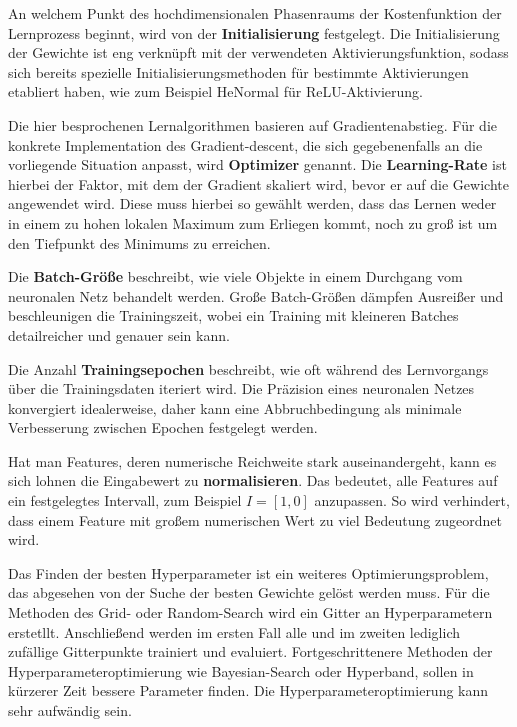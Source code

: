 An welchem Punkt des hochdimensionalen Phasenraums der Kostenfunktion der Lernprozess beginnt, wird von der \textbf{Initialisierung} festgelegt. Die Initialisierung der Gewichte ist eng verknüpft mit der verwendeten Aktivierungsfunktion, sodass sich bereits spezielle Initialisierungsmethoden für bestimmte Aktivierungen etabliert haben, wie zum Beispiel HeNormal für ReLU-Aktivierung. %

Die hier besprochenen Lernalgorithmen basieren auf Gradientenabstieg. Für die konkrete Implementation des Gradient-descent, die sich gegebenenfalls an die vorliegende Situation anpasst, wird \textbf{Optimizer} genannt. Die \textbf{Learning-Rate} ist hierbei der Faktor, mit dem der Gradient skaliert wird, bevor er auf die Gewichte angewendet wird. Diese muss hierbei so gewählt werden, dass das Lernen weder in einem zu hohen lokalen Maximum zum Erliegen kommt, noch zu groß ist um den Tiefpunkt des Minimums zu erreichen. 

Die \textbf{Batch-Größe} beschreibt, wie viele Objekte in einem Durchgang vom neuronalen Netz behandelt werden. Große Batch-Größen dämpfen Ausreißer und beschleunigen die Trainingszeit, wobei ein Training mit kleineren Batches detailreicher und genauer sein kann. 

Die Anzahl \textbf{Trainingsepochen} beschreibt, wie oft während des Lernvorgangs über die Trainingsdaten iteriert wird. Die Präzision eines neuronalen Netzes konvergiert idealerweise, daher kann eine Abbruchbedingung als minimale Verbesserung zwischen Epochen festgelegt werden. 

Hat man Features, deren numerische Reichweite stark auseinandergeht, kann es sich lohnen die Eingabewert zu \textbf{normalisieren}. Das bedeutet, alle Features auf ein festgelegtes Intervall, zum Beispiel $I=[1,0]$ anzupassen. So wird verhindert, dass einem Feature mit großem numerischen Wert zu viel Bedeutung zugeordnet wird.

Das Finden der besten Hyperparameter ist ein weiteres Optimierungsproblem, das abgesehen von der Suche der besten Gewichte gelöst werden muss. Für die Methoden des Grid- oder Random-Search wird ein Gitter an Hyperparametern erstetllt. Anschließend werden im ersten Fall alle und im zweiten lediglich zufällige Gitterpunkte trainiert und evaluiert. Fortgeschrittenere Methoden der Hyperparameteroptimierung wie Bayesian-Search oder Hyperband, sollen in kürzerer Zeit bessere Parameter finden. Die Hyperparameteroptimierung kann sehr aufwändig sein. 

